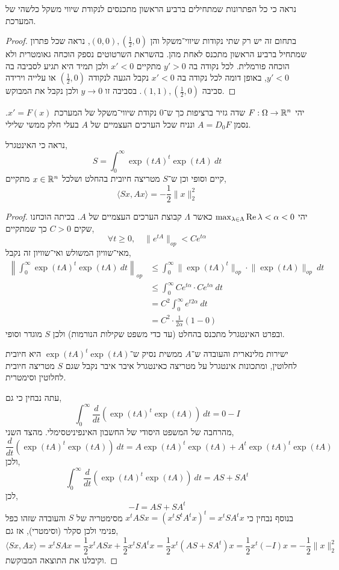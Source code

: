 \subquestion{}
נראה כי כל הפתרונות שמתחילים ברביע הראשון מתכנסים לנקודת שיווי משקל כלשהי של המערכת.
\begin{proof}
	בתחום זה יש רק שתי נקודות שיווי־משקל והן $(0, 0), (\frac{1}{2}, 0)$, נראה שכל פתרון שמתחיל ברביע הראשון מתכנס לאחת מהן.
	בהשראת השרטוטים נספק הוכחה גאומטרית ולא הוכחה פורמלית.
	לכל נקודה בה $y' > 0$ מתקיים $x' < 0$ ולכן תמיד היא תגיע לסביבה בה $y' < 0$, באופן דומה לכל נקודה בה $x' < 0$ נקבל הגעה לנקודה $(\frac{1}{2}, 0)$ או עלייה וירידה סביבה $(1,1), (\frac{1}{2},0)$.
	בסביבה זו $y \to 0$ ולכן נקבל את המבוקש.
\end{proof}

\question{}
יהי $F : \Omega \to \mathbb{R}^n$ שדה גזיר ברציפות כך ש־$0$ נקודת שיווי־משקל של המערכת $x' = F(x)$.
נסמן $A = D_0 F$ ונניח שכל הערכים העצמיים של $A$ בעלי חלק ממשי שלילי.

\subquestion{}
נראה כי האינטגרל,
\[
	S
	= \int_{0}^{\infty} {\exp(t A)}^t \exp(t A)\ dt
\]
קיים וסופי וכן ש־$S$ מטריצה חיובית בהחלט ושלכל $x \in \mathbb{R}^n$ מתקיים,
\[
	\langle S x, A x \rangle
	= -\frac{1}{2} \lVert x \rVert_2^2
\]
\begin{proof}
	יהי $\max_{\lambda \in \Lambda} \operatorname{Re} \lambda < \alpha < 0$ כאשר $\Lambda$ קבוצת הערכים העצמיים של $A$.
	בכיתה הוכחנו שקים $C > 0$ כך שמתקיים,
	\[
		\forall t \ge 0,
		\quad
		\lVert e^{t A} \rVert_{op}
		< C e^{t \alpha}
	\]
	מאי־שוויון המשולש ואי־שוויון זה נקבל,
	\begin{align*}
		\left\lVert \int_{0}^{\infty} {\exp(t A)}^t \exp(t A)\ dt \right\rVert_{op}
		& \le \int_{0}^{\infty} \lVert {\exp(t A)}^t \rVert_{op} \cdot \lVert \exp(t A) \rVert_{op}\ dt \\
		& \le \int_{0}^{\infty} C e^{t \alpha} \cdot C e^{t \alpha}\ dt \\
		& = C^2 \int_{0}^{\infty} e^{t 2\alpha}\ dt \\
		& = C^2 \cdot \frac{1}{2 \alpha} (1 - 0)
	\end{align*}
	ובפרט האינטגרל מתכנס בהחלט (עד כדי משפט שקילות הנורמות) ולכן $S$ מוגדר וסופי.
	
	ישירות מלינארית והעובדה ש־$A$ ממשית נסיק ש־${\exp(t A)}^t \exp(t A)$ היא חיובית לחלוטין, ומתכונות אינטגרל על מטריצה כאינטגרל איבר איבר נקבל שגם $S$ מטריצה חיובית לחלוטין וסימטרית.

	עתה נבחין כי גם,
	\[
		\int_{0}^{\infty} \frac{d}{dt} ({\exp(t A)}^t \exp(t A))\ dt
		= 0 - I
	\]
	מהרחבה של המשפט היסודי של החשבון האינפיניטסימלי.
	מהצד השני,
	\[
		\frac{d}{dt} ({\exp(t A)}^t \exp(t A))\ dt
		= A {\exp(t A)}^t \exp(t A) + A^t {\exp(t A)}^t \exp(t A)
	\]
	ולכן,
	\[
		\int_{0}^{\infty} \frac{d}{dt} ({\exp(t A)}^t \exp(t A))\ dt
		= A S + S A^t
	\]
	לכן,
	\[
		-I = A S + S A^t
	\]
	בנוסף נבחין כי $x^t A S x = {(x^t S^t A^t x)}^t = x^t S A^t x$ מסימטריה של $S$ והעובדה שזהו כפל פנימי ולכן סקלר (וסימטרי), אז גם,
	\[
		\langle S x, A x \rangle
		= x^t S A x
		= \frac{1}{2} x^t A S x + \frac{1}{2} x^t S A^t x
		= \frac{1}{2} x^t (A S + S A^t) x
		= \frac{1}{2} x^t (-I) x
		= -\frac{1}{2} \lVert x \rVert_2^2
	\]
	וקיבלנו את התוצאה המבוקשת.
\end{proof}

